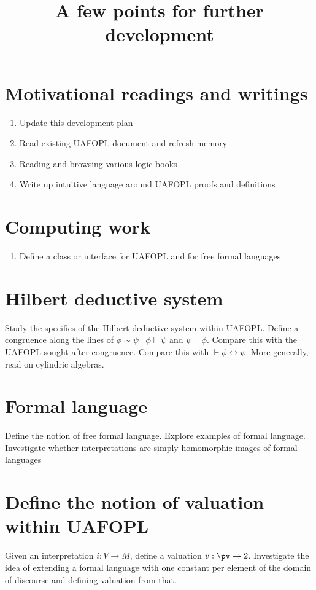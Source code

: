 \documentclass{article}
\title{A few points for further development}
\begin{document}
\maketitle

\section{Motivational readings and writings}
\begin{enumerate}
\item
Update this development plan
\item
Read existing UAFOPL document and refresh memory
\item
Reading and browsing various logic books
\item
Write up intuitive language around UAFOPL proofs and definitions
\end{enumerate}

\section{Computing work}
\begin{enumerate}
\item
Define a class or interface for UAFOPL and for free formal languages
\end{enumerate}

\section{Hilbert deductive system}
Study the specifics of the Hilbert deductive system within UAFOPL.
Define a congruence along the lines of $\phi\sim\psi$ \ifand\
$\phi\vdash\psi$ and $\psi\vdash\phi$. Compare this with the UAFOPL
sought after congruence. Compare this with $\vdash
\phi\leftrightarrow\psi$. More generally, read on cylindric
algebras.

\section{Formal language}
Define the notion of free formal language. Explore examples of
formal language. Investigate whether interpretations are simply
homomorphic images of formal languages


\section{Define the notion of valuation within UAFOPL}
Given an interpretation $i:V\rightarrow M$, define a valuation
$v:\pv\rightarrow 2$. Investigate the idea of extending a formal
language with one constant per element of the domain of discourse
and defining valuation from that.
\end{document}
